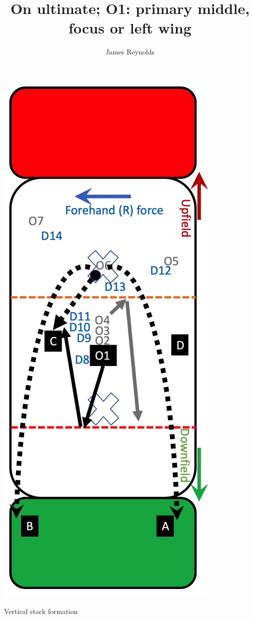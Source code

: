 \documentclass{tufte-handout}
\title{On ultimate; O1: primary middle, focus or left wing}
\author[James Reynolds]{James Reynolds}
\begin{document}
\maketitle%


\begin{marginfigure}%
  \includegraphics[width=\linewidth]{O1-vertical}
  \caption{Vertical stack formation}
  \label{fig:O1-vertical}
\end{marginfigure}
\end{document}
